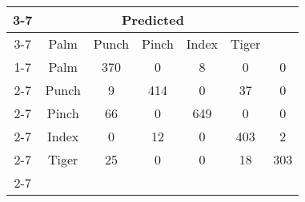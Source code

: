 \documentclass{standalone}
\begin{document}
 
 \begin{tabular}{|c |c |c |c |c |c |c |}
\cline{3-7}\multicolumn{2}{c|}{} & \multicolumn{5}{c|}{Predicted} \\ 
\cline{3-7} \multicolumn{2}{c |}{ } & Palm & Punch & Pinch & Index & Tiger\\ 
\cline{1-7}\multirow{5}{*}{\rotatebox[origin=c]{90}{Actual}} & Palm & 370 & 0 & 8 & 0 & 0\\ 
 \cline{2-7} & Punch & 9 & 414 & 0 & 37 & 0\\ 
 \cline{2-7} & Pinch & 66 & 0 & 649 & 0 & 0\\ 
 \cline{2-7} & Index & 0 & 12 & 0 & 403 & 2\\ 
 \cline{2-7} & Tiger & 25 & 0 & 0 & 18 & 303\\ 
 \cline{2-7}\hline \end{tabular}
 
\end{document}

